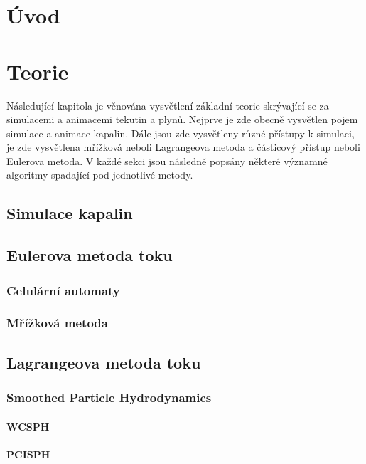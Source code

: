 \chapter{Úvod}
\label{chapter:uvod}

\chapter{Teorie}
Následující kapitola je věnována vysvětlení základní teorie skrývající se za simulacemi a animacemi tekutin a plynů. Nejprve je zde obecně vysvětlen pojem simulace a animace kapalin. Dále jsou zde vysvětleny různé přístupy k simulaci, je zde vysvětlena mřížková neboli Lagrangeova metoda a částicový přístup neboli Eulerova metoda. V každé sekci jsou následně popsány některé významné algoritmy spadající pod jednotlivé metody.

\label{chapter:teorie}
\section{Simulace kapalin}
\section{Eulerova metoda toku}
\subsection{Celulární automaty}
\subsection{Mřížková metoda}
\section{Lagrangeova metoda toku}
\subsection{Smoothed Particle Hydrodynamics}
\subsubsection{WCSPH}
\subsubsection{PCISPH}
